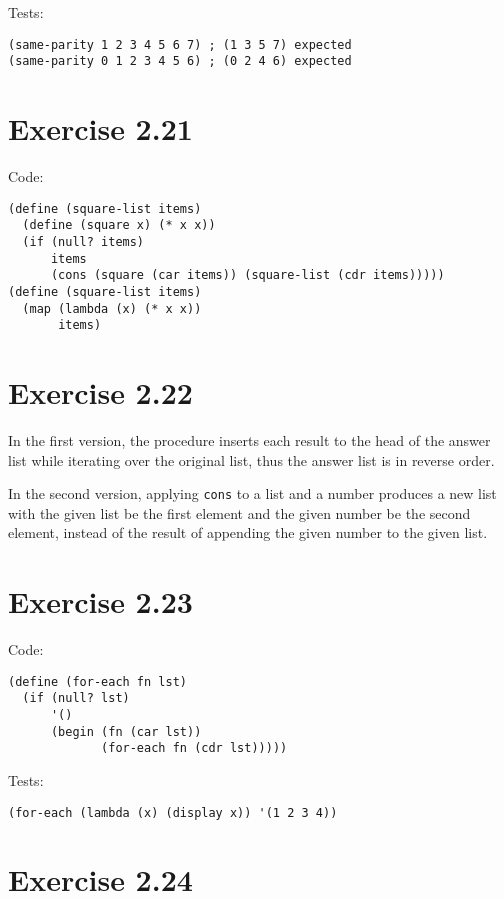 \documentclass[../main.tex]{subfiles}
\begin{document}
Tests:

\begin{lstlisting}
(same-parity 1 2 3 4 5 6 7) ; (1 3 5 7) expected
(same-parity 0 1 2 3 4 5 6) ; (0 2 4 6) expected
\end{lstlisting}

\section{Exercise 2.21}

Code:

\begin{lstlisting}
(define (square-list items)
  (define (square x) (* x x))
  (if (null? items)
      items
      (cons (square (car items)) (square-list (cdr items)))))
(define (square-list items)
  (map (lambda (x) (* x x))
       items)
\end{lstlisting}

\section{Exercise 2.22}

In the first version, the procedure inserts
 each result to the head of the answer list
 while iterating over the original list, thus
 the answer list is in reverse order.

In the second version, applying \lstinline{cons}
 to a list and a number produces a new list with
 the given list be the first element and the given
 number be the second element, instead of the result
 of appending the given number to the given list.

\section{Exercise 2.23}

Code:

\begin{lstlisting}
(define (for-each fn lst)
  (if (null? lst)
      '()
      (begin (fn (car lst))
             (for-each fn (cdr lst)))))
\end{lstlisting}

Tests:

\begin{lstlisting}
(for-each (lambda (x) (display x)) '(1 2 3 4))
\end{lstlisting}

\section{Exercise 2.24}
\end{document}
